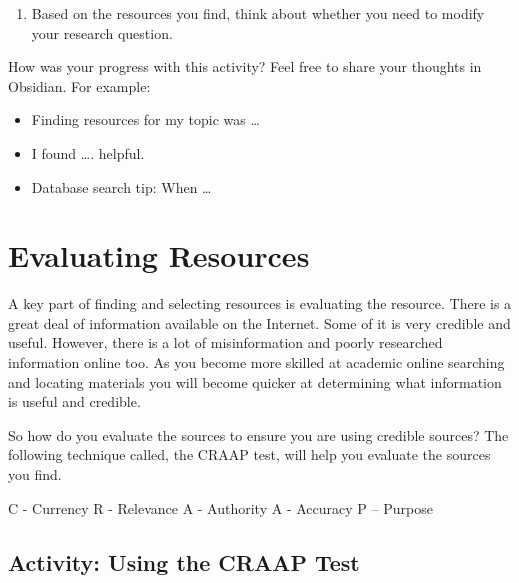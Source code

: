 \documentclass[
]{book}
\providecommand{\tightlist}{%
  \setlength{\itemsep}{0pt}\setlength{\parskip}{0pt}}
\theoremstyle{definition}
\theoremstyle{definition}
\theoremstyle{definition}
\theoremstyle{definition}
\theoremstyle{remark}
\begin{document}
\begin{reflect}
\begin{enumerate}
\def\labelenumi{\arabic{enumi}.}
\setcounter{enumi}{3}
\tightlist
\item
  Based on the resources you find, think about whether you need to modify your research question.
\end{enumerate}

How was your progress with this activity? Feel free to share your thoughts in Obsidian. For example:

\begin{itemize}
\tightlist
\item
  Finding resources for my topic was \ldots{}\\
\item
  I found \ldots. helpful.\\
\item
  Database search tip: When \ldots{}
\end{itemize}
\end{reflect}

\hypertarget{evaluating-resources}{%
\section{Evaluating Resources}\label{evaluating-resources}}

A key part of finding and selecting resources is evaluating the resource. There is a great deal of information available on the Internet. Some of it is very credible and useful. However, there is a lot of misinformation and poorly researched information online too. As you become more skilled at academic online searching and locating materials you will become quicker at determining what information is useful and credible.

So how do you evaluate the sources to ensure you are using credible sources? The following technique called, the CRAAP test, will help you evaluate the sources you find.

C - Currency
R - Relevance
A - Authority
A - Accuracy
P -- Purpose

\hypertarget{activity-using-the-craap-test}{%
\subsection*{Activity: Using the CRAAP Test}\label{activity-using-the-craap-test}}
\end{document}
